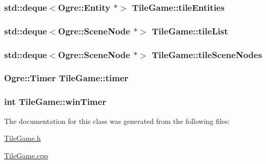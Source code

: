 \hypertarget{classTileGame_aad2a30c885c91193d0a6da18f1477de5}{
\subsubsection[{tile\-Entities}]{\setlength{\rightskip}{0pt plus 5cm}std\-::deque$<$Ogre\-::\-Entity $\ast$$>$ Tile\-Game\-::tile\-Entities\hspace{0.3cm}{\ttfamily [protected]}}}\label{classTileGame_aad2a30c885c91193d0a6da18f1477de5}
\hypertarget{classTileGame_ad9bec31020eaa7dc719d8e9b8af20ee2}{
\subsubsection[{tile\-List}]{\setlength{\rightskip}{0pt plus 5cm}std\-::deque$<$Ogre\-::\-Scene\-Node $\ast$$>$ Tile\-Game\-::tile\-List\hspace{0.3cm}{\ttfamily [protected]}}}\label{classTileGame_ad9bec31020eaa7dc719d8e9b8af20ee2}
\hypertarget{classTileGame_ac8b228c7849cb924a099f94de266c42d}{
\subsubsection[{tile\-Scene\-Nodes}]{\setlength{\rightskip}{0pt plus 5cm}std\-::deque$<$Ogre\-::\-Scene\-Node $\ast$$>$ Tile\-Game\-::tile\-Scene\-Nodes\hspace{0.3cm}{\ttfamily [protected]}}}\label{classTileGame_ac8b228c7849cb924a099f94de266c42d}
\hypertarget{classTileGame_adbfc142c4bd14007f4aec65b164bbea7}{
\subsubsection[{timer}]{\setlength{\rightskip}{0pt plus 5cm}Ogre\-::\-Timer Tile\-Game\-::timer\hspace{0.3cm}{\ttfamily [protected]}}}\label{classTileGame_adbfc142c4bd14007f4aec65b164bbea7}
\hypertarget{classTileGame_a05d9bbf0aebd4822ed518804eeb899fa}{
\subsubsection[{win\-Timer}]{\setlength{\rightskip}{0pt plus 5cm}int Tile\-Game\-::win\-Timer\hspace{0.3cm}{\ttfamily [protected]}}}\label{classTileGame_a05d9bbf0aebd4822ed518804eeb899fa}


The documentation for this class was generated from the following files\-:\begin{DoxyCompactItemize}
\item 
\hyperlink{TileGame_8h}{Tile\-Game.\-h}\item 
\hyperlink{TileGame_8cpp}{Tile\-Game.\-cpp}\end{DoxyCompactItemize}
